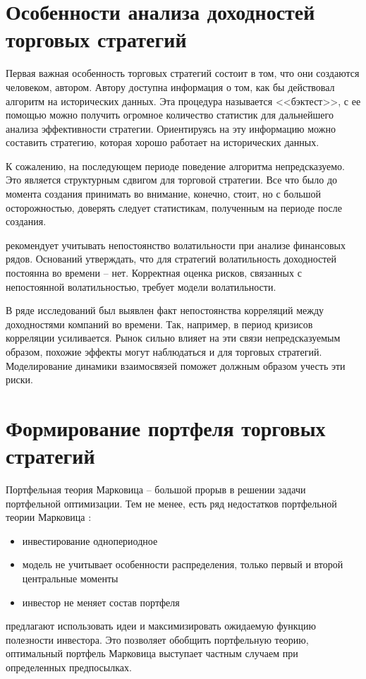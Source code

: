 \section{Особенности анализа доходностей торговых стратегий}
Первая важная особенность торговых стратегий состоит в том, что они создаются человеком, автором. Автору доступна информация о том, как бы действовал алгоритм на исторических данных. Эта процедура называется <<бэктест>>, с ее помощью можно получить огромное количество статистик для дальнейшего анализа эффективности стратегии. Ориентируясь на эту информацию можно составить стратегию, которая хорошо работает на исторических данных. 

К сожалению, на последующем периоде поведение алгоритма непредсказуемо. Это является структурным сдвигом для торговой стратегии. Все что было до момента создания принимать во внимание, конечно, стоит, но с большой осторожностью, доверять следует статистикам, полученным на периоде после создания.
 
\citep{dumas1998} рекомендует учитывать непостоянство волатильности при анализе финансовых рядов. Оснований утверждать, что для стратегий волатильность доходностей постоянна во времени -- нет. Корректная оценка рисков, связанных с непостоянной волатильностью, требует модели волатильности.

В ряде исследований \citep{vaga1990, oral2017} был выявлен факт непостоянства корреляций между доходностями компаний во времени. Так, например, в период кризисов корреляции усиливается. Рынок сильно влияет на эти связи непредсказуемым образом, похожие эффекты могут наблюдаться и для торговых стратегий. Моделирование динамики взаимосвязей поможет должным образом учесть эти риски.
\section{Формирование портфеля торговых стратегий}

Портфельная теория Марковица \citep{markovitz1959} -- большой прорыв в решении задачи портфельной оптимизации.
Тем не менее, есть ряд недостатков портфельной теории Марковица \citep{lorenz2008thesis}:
\begin{itemize}
	\item инвестирование однопериодное
	\item модель не учитывает особенности распределения, только первый и второй центральные моменты
	\item инвестор не меняет состав портфеля
\end{itemize}
\cite{lorenz2008thesis, bucciol2006} предлагают использовать идеи \cite{neumann1944} и максимизировать ожидаемую функцию полезности инвестора. Это позволяет обобщить портфельную теорию, оптимальный портфель Марковица выступает частным случаем при определенных предпосылках.

